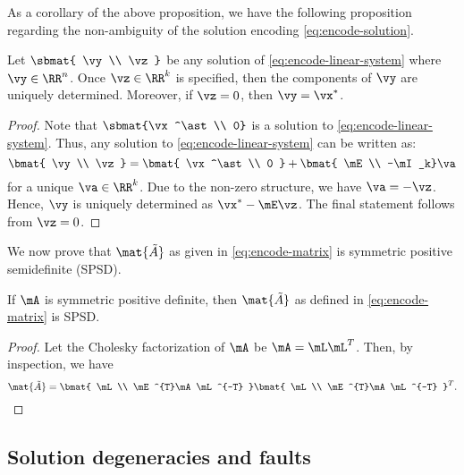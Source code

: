 \documentclass[11pt]{article}
\newcommand{\Tr}{{T}}
\newcommand{\tA}{\mat{\tilde{A}}}
\begin{document}
As a corollary of the above proposition, we have the following proposition regarding the non-ambiguity of the solution encoding \eqref{eq:encode-solution}.
\begin{proposition}
Let $\sbmat{ \vy \\ \vz}$ be any solution of \eqref{eq:encode-linear-system} where $\vy \in \RR^{n}$. Once $\vz \in \RR^{k}$ is specified, then the components of $\vy$ are uniquely determined. Moreover, if $\vz = 0$, then $\vy = \vx^\ast$.
\label{prop:non-ambiguity}
\end{proposition}
\begin{proof}
Note that $\sbmat{\vx^\ast \\ 0}$ is a solution to \eqref{eq:encode-linear-system}. Thus, any solution to \eqref{eq:encode-linear-system} can be written as: 
\[ \bmat{ \vy \\ \vz } = \bmat{ \vx^\ast \\ 0 } + \bmat{ \mE \\ -\mI_k} \va \]
for a unique $\va \in \RR^{k}$. Due to the non-zero structure, we have $\va = -\vz$. Hence, $\vy$ is uniquely determined as $\vx^\ast - \mE \vz$. The final statement follows from $\vz = 0$.
\end{proof}

We now prove that $\tA$ as given in \eqref{eq:encode-matrix} is symmetric positive semidefinite (SPSD).
\begin{proposition}
If $\mA$ is symmetric positive definite, then $\tA$ as defined in \eqref{eq:encode-matrix} is SPSD.
\label{prop:encode-matrix-SPD}
\end{proposition}
\begin{proof}
Let the Cholesky factorization of $\mA$ be $\mA = \mL \mL^T$. Then, by inspection, we have 
\[ \tA = \bmat{ \mL \\ \mE^\Tr \mA \mL^{-T} } \bmat{ \mL \\ \mE^\Tr \mA \mL^{-T} }^T. \]
\end{proof}

\subsection{Solution degeneracies and faults}
\end{document}
